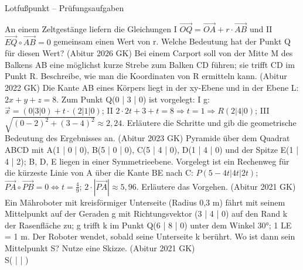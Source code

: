 \begin{aufgabe}{Lotfußpunkt – Prüfungsaufgaben}
\begin{teile}
\teil An einem Zeltgestänge liefern die Gleichungen I $\overrightarrow{OQ} = \overrightarrow{OA} + r \cdot \overrightarrow{AB}$ und II $\overrightarrow{EQ} \circ \overrightarrow{AB} = 0$ gemeinsam einen Wert von r. Welche Bedeutung hat der Punkt Q für diesen Wert? \hfill (Abitur 2026 GK)
\teil Bei einem Carport soll von der Mitte M des Balkens AB eine möglichst kurze Strebe zum Balken CD führen; sie trifft CD im Punkt R. Beschreibe, wie man die Koordinaten von R ermitteln kann. \hfill (Abitur 2022 GK)
\teil Die Kante AB eines Körpers liegt in der xy-Ebene und in der Ebene L: $2x + y + z = 8$. Zum Punkt Q(0 | 3 | 0) ist vorgelegt: I g: $\vec x = (0 | 3 | 0) + t \cdot (2 | 1 | 0)$; II $2 \cdot 2t + 3 + t = 8 \Rightarrow t = 1 \Rightarrow R(2 | 4 | 0)$; III $\sqrt{(0 - 2)^2 + (3 - 4)^2} \approx 2{,}24$. Erläutere die Schritte und gib die geometrische Bedeutung des Ergebnisses an. \hfill (Abitur 2023 GK)
\teil Pyramide über dem Quadrat ABCD mit A(1 | 0 | 0), B(5 | 0 | 0), C(5 | 4 | 0), D(1 | 4 | 0) und der Spitze E(1 | 4 | 2); B, D, E liegen in einer Symmetrieebene. Vorgelegt ist ein Rechenweg für die kürzeste Linie von A über die Kante BE nach C: $P(5 - 4t | 4t | 2t)$; $\overrightarrow{PA} \circ \overrightarrow{PB} = 0 \Leftrightarrow t = \tfrac{4}{9}$; $2 \cdot |\overrightarrow{PA}| \approx 5{,}96$. Erläutere das Vorgehen. \hfill (Abitur 2021 GK)
\teil Ein Mähroboter mit kreisförmiger Unterseite (Radius 0,3 m) fährt mit seinem Mittelpunkt auf der Geraden g mit Richtungsvektor (3 | 4 | 0) auf den Rand k der Rasenfläche zu; g trifft k im Punkt Q(6 | 8 | 0) unter dem Winkel 30°; 1 LE = 1 m. Der Roboter wendet, sobald seine Unterseite k berührt. Wo ist dann sein Mittelpunkt S? Nutze eine Skizze. \hfill (Abitur 2021 GK) \\ S( \leerfeld | \leerfeld | \leerfeld )
\end{teile}
\end{aufgabe}

